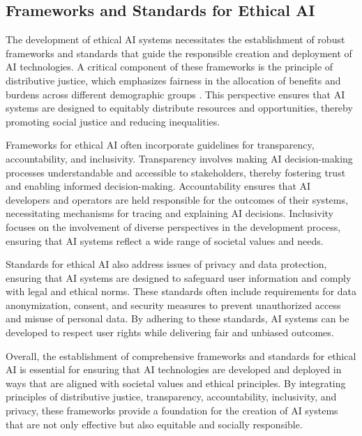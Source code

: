 
\subsection{Frameworks and Standards for Ethical AI} \label{subsec:Frameworks and Standards for Ethical AI}

The development of ethical AI systems necessitates the establishment of robust frameworks and standards that guide the responsible creation and deployment of AI technologies. A critical component of these frameworks is the principle of distributive justice, which emphasizes fairness in the allocation of benefits and burdens across different demographic groups \cite{brandao2020fairnavigationplanninghumanitarian}. This perspective ensures that AI systems are designed to equitably distribute resources and opportunities, thereby promoting social justice and reducing inequalities.



Frameworks for ethical AI often incorporate guidelines for transparency, accountability, and inclusivity. Transparency involves making AI decision-making processes understandable and accessible to stakeholders, thereby fostering trust and enabling informed decision-making. Accountability ensures that AI developers and operators are held responsible for the outcomes of their systems, necessitating mechanisms for tracing and explaining AI decisions. Inclusivity focuses on the involvement of diverse perspectives in the development process, ensuring that AI systems reflect a wide range of societal values and needs.



Standards for ethical AI also address issues of privacy and data protection, ensuring that AI systems are designed to safeguard user information and comply with legal and ethical norms. These standards often include requirements for data anonymization, consent, and security measures to prevent unauthorized access and misuse of personal data. By adhering to these standards, AI systems can be developed to respect user rights while delivering fair and unbiased outcomes.



Overall, the establishment of comprehensive frameworks and standards for ethical AI is essential for ensuring that AI technologies are developed and deployed in ways that are aligned with societal values and ethical principles. By integrating principles of distributive justice, transparency, accountability, inclusivity, and privacy, these frameworks provide a foundation for the creation of AI systems that are not only effective but also equitable and socially responsible.



